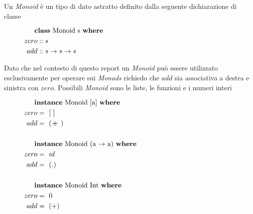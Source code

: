 \label{monoid}

Un \textit{Monoid} è un tipo di dato astratto definito dalla seguente
dichiarazione di classe

\begin{figure}[H]
  \centering
  \footnotesize %
  \begin{align*}
  \noalign{\textbf{class}\ Monoid\ s\  \textbf{where}}
  zero &:: s\\
  add &:: s \to s \to s
  \end{align*}%
\end{figure}

Dato che nel contesto di questo report un \textit{Monoid} può essere utilizzato
esclusivamente per operare sui \textit{Monads} richiedo che $add$ sia
associativa a destra e sinistra con $zero$.
Possibili \textit{Monoid} sono le liste, le funzioni e i numeri interi

\begin{figure}[H]
  \centering
  \footnotesize %
  \begin{align*}
  \noalign{\textbf{instance}\ Monoid\ [a]\  \textbf{where}}
  zero &=\ [\ ]\\
  add &=\  (\doubleplus)\\\\
  \noalign{\textbf{instance}\ Monoid\ (a $\to$ a)\  \textbf{where}}
  zero &=\  id\\
  add &=\  ( . )\\\\
  \noalign{\textbf{instance}\ Monoid\ Int\  \textbf{where}}
  zero &=\  0\\
  add &=\ (+)
  \end{align*}%
\end{figure}